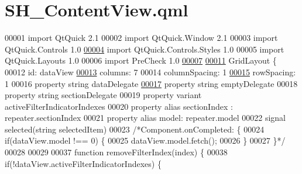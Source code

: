 \hypertarget{SH__ContentView_8qml}{\section{S\-H\-\_\-\-Content\-View.\-qml}
\label{SH__ContentView_8qml}
}

\begin{DoxyCode}
00001 \textcolor{keyword}{import} QtQuick 2.1
00002 import QtQuick.Window 2.1
00003 import QtQuick.Controls 1.0
\hypertarget{SH__ContentView_8qml_source_l00004}{}\hyperlink{classSH__ContentView}{00004} import QtQuick.Controls.Styles 1.0
00005 import QtQuick.Layouts 1.0
00006 import PreCheck 1.0
\hypertarget{SH__ContentView_8qml_source_l00007}{}\hyperlink{classSH__ContentView_a4587c7cc61cefdb55d96e2f3b05e02b4}{00007} 
\hypertarget{SH__ContentView_8qml_source_l00011}{}\hyperlink{classSH__ContentView_a5a5fa8f42e23b857494f2c88b39d1177}{00011} GridLayout \{
00012     \textcolor{keywordtype}{id}: dataView
\hypertarget{SH__ContentView_8qml_source_l00013}{}\hyperlink{classSH__ContentView_a7ea5cf24986d3fb77ebcdfc9c3a3822a}{00013}     columns: 7
00014     columnSpacing: 1
\hypertarget{SH__ContentView_8qml_source_l00015}{}\hyperlink{classSH__ContentView_a554c2eaf9b48986c87fa8fb0178c0d1d}{00015}     rowSpacing: 1
00016     \textcolor{keyword}{property} \textcolor{keywordtype}{string} dataDelegate
\hypertarget{SH__ContentView_8qml_source_l00017}{}\hyperlink{classSH__ContentView_ace8288902fb10eb93de67293bc8ac57c}{00017}     \textcolor{keyword}{property} \textcolor{keywordtype}{string} emptyDelegate
00018     \textcolor{keyword}{property} \textcolor{keywordtype}{string} sectionDelegate
00019     \textcolor{keyword}{property} variant activeFilterIndicatorIndexes
00020     \textcolor{keyword}{property} alias sectionIndex : repeater.sectionIndex
00021     \textcolor{keyword}{property} alias model: repeater.model
00022     signal selected(\textcolor{keywordtype}{string} selectedItem)
00023     \textcolor{comment}{/*Component.onCompleted: \{}
00024 \textcolor{comment}{        if(dataView.model !== 0) \{}
00025 \textcolor{comment}{            dataView.model.fetch();}
00026 \textcolor{comment}{        \}}
00027 \textcolor{comment}{    \}*/}
00028 
00029     
00037     \textcolor{keyword}{function} removeFilterIndex(index) \{
00038         \textcolor{keywordflow}{if}(!dataView.activeFilterIndicatorIndexes) \{

\end{DoxyCode}

